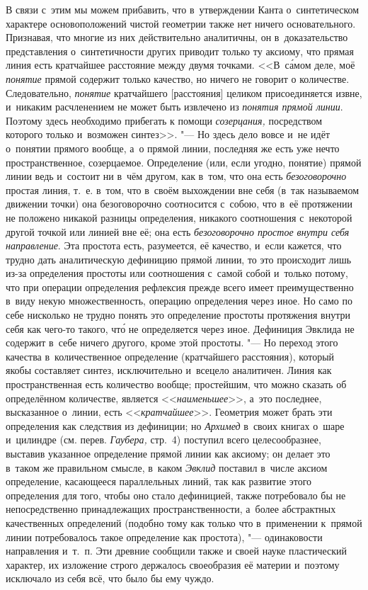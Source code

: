 В связи с~этим мы можем прибавить, что в~утверждении Канта о~синтетическом
характере основоположений чистой геометрии также нет ничего основательного.
Признавая, что многие из них действительно аналитичны, он в~доказательство
представления о~синтетичности других приводит только ту аксиому, что прямая
линия есть кратчайшее расстояние между двумя точками. <<В~с\'{а}мом деле, моё
{\em понятие} прямой содержит только качество, но ничего не говорит
о количестве. Следовательно, {\em понятие} кратчайшего [расстояния]
целиком присоединяется извне, и~никаким расчленением не может быть извлечено
из {\em понятия прямой линии}. Поэтому здесь необходимо прибегать
к помощи {\em созерцания,} посредством которого только и~возможен
синтез>>. "--- Но здесь дело вовсе и~не идёт о~понятии прямого вообще, а~о
прямой линии, последняя же есть уже нечто пространственное, созерцаемое.
Определение (или, если угодно, понятие) прямой линии ведь и~состоит ни в~чём
другом, как в~том, что она есть {\em безоговорочно} простая линия, т.~е. в~том,
что в~своём выхождении вне себя (в~так называемом движении точки) она
безоговорочно соотносится с~собою, что в~её протяжении не положено никакой
разницы определения, никакого соотношения с~некоторой другой точкой или линией
вне её; она есть {\em безоговорочно простое внутри себя направление}. Эта
простота есть, разумеется, её качество, и~если кажется, что трудно дать
аналитическую дефиницию прямой линии, то это происходит лишь из-за определения
простоты или соотношения с~самой собой и~только потому, что при операции
определения рефлексия прежде всего имеет преимущественно в~виду некую
множественность, операцию определения через иное. Но само по себе нисколько
не трудно понять это определение простоты протяжения внутри себя как чего-то
такого, чт\'{о} не определяется через иное. Дефиниция Эвклида не содержит в~себе ничего
другого, кроме этой простоты. "--- Но переход этого качества в~количественное
определение (кратчайшего расстояния), который якобы составляет синтез,
исключительно и~всецело аналитичен. Линия как пространственная есть количество
вообще; простейшим, что можно сказать об определённом количестве, является
<<{\em наименьшее}>>, а~это последнее, высказанное о~линии, есть
<<{\em кратчайшее}>>. Геометрия может брать эти определения как следствия из
дефиниции; но {\em Архимед} в~своих книгах о~шаре и~цилиндре (см. перев.
{\em Гаубера,} стр.~4) поступил всего целесообразнее, выставив указанное
определение прямой линии как аксиому; он делает это в~таком же правильном
смысле, в~каком {\em Эвклид} поставил в~числе аксиом определение, касающееся
параллельных линий, так как развитие этого определения для того, чтобы оно
стало дефиницией, также потребовало бы не непосредственно принадлежащих
пространственности, а~более абстрактных качественных определений (подобно тому
как только что в~применении к~прямой линии потребовалось такое определение как
простота), "--- одинаковости направления и~т.~п. Эти древние сообщили также и
своей науке пластический характер, их изложение строго держалось своеобразия её
материи и~поэтому исключало из себя всё, что было бы ему чуждо.

